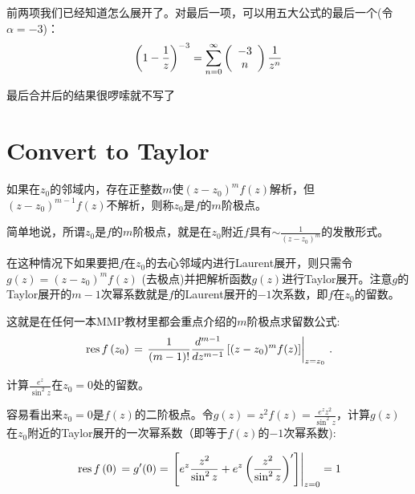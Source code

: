 \documentclass[CJK]{beamer}
\begin{document}
\begin{frame}
  \bch
  前两项我们已经知道怎么展开了。对最后一项，可以用五大公式的最后一个(令$\alpha=-3$)：
  $$  \left(1-\frac{1}{z}\right)^{-3} = \sum_{n=0}^\infty \left(\begin{array}{c}-3\\ n\end{array}\right)\frac{1}{z^n}$$
  
  \bye 最后合并后的结果很啰嗦就不写了
  \ech
\end{frame}

\section{Convert to Taylor}

\begin{frame}
  \bch
          {\blue  如果在$z_0$的邻域内，存在正整数$m$使$(z-z_0)^mf(z)$解析，但$(z-z_0)^{m-1}f(z)$不解析，则称$z_0$是$f$的$m$阶极点。}

          \skiplines

          简单地说，所谓$z_0$是$f$的$m$阶极点，就是在$z_0$附近$f$具有$\sim \frac{1}{(z-z_0)^m}$的发散形式。

          \skiplines
          
          在这种情况下如果要把$f$在$z_0$的去心邻域内进行Laurent展开，则只需令$g(z) = (z-z_0)^mf(z)$ (去极点)并把解析函数$g(z)$进行Taylor展开。注意$g$的Taylor展开的$m-1$次幂系数就是$f$的Laurent展开的$-1$次系数，即$f$在$z_0$的留数。

            这就是在任何一本MMP教材里都会重点介绍的{\blue $m$阶极点求留数公式:
            $$\,\mathrm{res}\,f\left(z_0\right)\, = \left.\frac{1}{(m-1)!}\frac{d^{m-1}}{dz^{m-1}} \left[(z-z_0)^mf(z)\right] \right\vert_{z=z_0}\, .$$
        }
          \ech
\end{frame}

\begin{frame}
  \bch
  
  计算$\frac{e^z}{\sin^2 z}$在$z_0=0$处的留数。
  \ech
\end{frame}

\begin{frame}
  \bch
  容易看出来$z_0=0$是$f(z)$的二阶极点。令$g(z) = z^2 f(z) = \frac{e^zz^2}{\sin^2 z}$，计算$g(z)$在$z_0$附近的Taylor展开的一次幂系数（即等于$f(z)$的$-1$次幂系数):

    $$\,\mathrm{res}\,f\left(0\right)\, = g'(0) =\left.\left[ e^z\frac{z^2}{\sin^2z} + e^z\left(\frac{z^2}{\sin^2z}\right)'\right]\right\vert_{z=0} = 1$$

    
  \ech
\end{frame}
\end{document}
